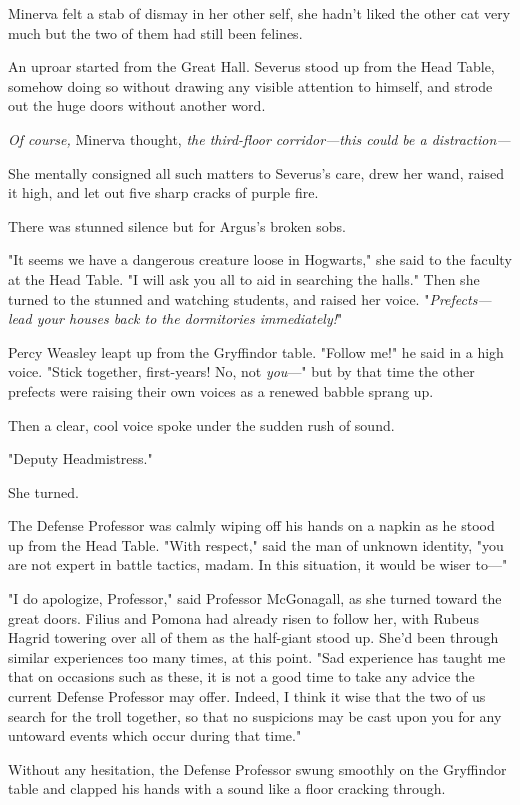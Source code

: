 Minerva felt a stab of dismay in her other self, she hadn't liked the other cat
very much but the two of them had still been felines.

An uproar started from the Great Hall. Severus stood up from the Head Table,
somehow doing so without drawing any visible attention to himself, and strode
out the huge doors without another word.

\emph{Of course,} Minerva thought, \emph{the third-floor corridor—this could
be a distraction—}

She mentally consigned all such matters to Severus's care, drew her wand,
raised it high, and let out five sharp cracks of purple fire.

There was stunned silence but for Argus's broken sobs.

"It seems we have a dangerous creature loose in Hogwarts," she said to the
faculty at the Head Table. "I will ask you all to aid in searching the halls."
Then she turned to the stunned and watching students, and raised her voice.
"\emph{Prefects—lead your houses back to the dormitories immediately!}"

Percy Weasley leapt up from the Gryffindor table. "Follow me!" he said in a
high voice. "Stick together, first-years! No, not \emph{you}—" but by that
time the other prefects were raising their own voices as a renewed babble
sprang up.

Then a clear, cool voice spoke under the sudden rush of sound.

"Deputy Headmistress."

She turned.

The Defense Professor was calmly wiping off his hands on a napkin as he stood
up from the Head Table. "With respect," said the man of unknown identity, "you
are not expert in battle tactics, madam. In this situation, it would be wiser
to—"

"I do apologize, Professor," said Professor McGonagall, as she turned toward
the great doors. Filius and Pomona had already risen to follow her, with Rubeus
Hagrid towering over all of them as the half-giant stood up. She'd been through
similar experiences too many times, at this point. "Sad experience has taught
me that on occasions such as these, it is not a good time to take any advice
the current Defense Professor may offer. Indeed, I think it wise that the two
of us search for the troll together, so that no suspicions may be cast upon you
for any untoward events which occur during that time."

Without any hesitation, the Defense Professor swung smoothly on the Gryffindor
table and clapped his hands with a sound like a floor cracking through.

